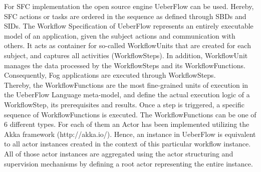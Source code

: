 For SFC implementation the open source engine UeberFlow \cite{DynamicPerspective} can be used. Hereby, SFC actions or tasks are ordered in the sequence as defined through SBDs and SIDs. The Workflow Specification of UeberFlow represents an entirely executable model of an application, given the subject actions and communication with others. It acts as container for so-called WorkflowUnits that are created for each subject, and captures all activities (WorkflowSteps). In addition, WorkflowUnit manages the data processed by the WorkflowSteps and its WorkflowFunctions. Consequently, Fog applications are executed through WorkflowSteps. 
\\
Thereby, the WorkflowFunctions are the most fine-grained units of execution in the UeberFlow Language meta-model, and define the actual execution logic of a WorkflowStep, its prerequisites and results. Once a step is triggered, a specific sequence of WorkflowFunctions is executed. The WorkflowFunctions can be one of 6 different types. For each of them an Actor has been implemented utilizing the Akka framework (http://akka.io/). Hence, an instance in UeberFlow is equivalent to all actor instances created in the context of this particular workflow instance. All of those actor instances are aggregated using the actor structuring and supervision mechanisms by defining a root actor representing the entire instance.

